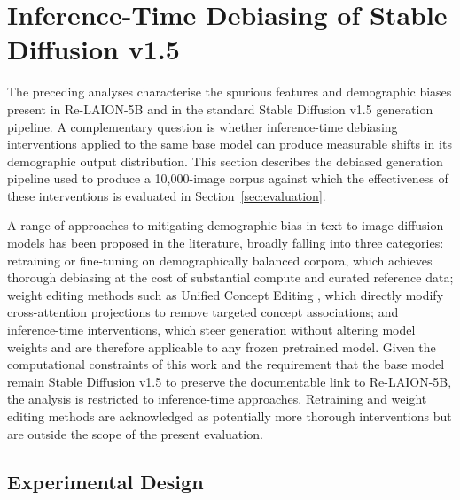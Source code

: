 \section{Inference-Time Debiasing of Stable Diffusion v1.5}
\label{sec:debiased_generation}

The preceding analyses characterise the spurious features and 
demographic biases present in Re-LAION-5B and in the standard 
Stable Diffusion v1.5 generation pipeline. A complementary 
question is whether inference-time debiasing interventions 
applied to the same base model can produce measurable shifts 
in its demographic output distribution. This section describes 
the debiased generation pipeline used to produce a 
10{,}000-image corpus against which the effectiveness of these 
interventions is evaluated in Section~\ref{sec:evaluation}.

A range of approaches to mitigating demographic bias in 
text-to-image diffusion models has been proposed in the 
literature, broadly falling into three categories: retraining 
or fine-tuning on demographically balanced corpora, which 
achieves thorough debiasing at the cost of substantial compute 
and curated reference data; weight editing methods such as 
Unified Concept Editing \cite{Gandikota_2024_UCE}, which 
directly modify cross-attention projections to remove targeted 
concept associations; and inference-time interventions, which 
steer generation without altering model weights and are 
therefore applicable to any frozen pretrained model. Given the 
computational constraints of this work and the requirement that 
the base model remain Stable Diffusion v1.5 to preserve the 
documentable link to Re-LAION-5B, the analysis is restricted 
to inference-time approaches. Retraining and weight editing 
methods are acknowledged as potentially more thorough 
interventions but are outside the scope of the present 
evaluation.

\subsection{Experimental Design}
\label{subsec:debias_design}

